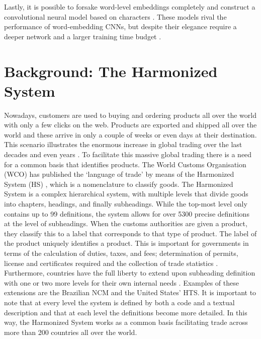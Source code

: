 Lastly, it is possible to forsake word-level embeddings completely and construct a convolutional neural model based on characters \cite{Zhang2015, Conneau2017, Shrestha}. These models rival the performance of word-embedding CNNs, but despite their elegance require a deeper network and a larger training time budget \cite{Le2017, Conneau2017, Adams2018}.

\newpage
\section{Background: The Harmonized System}
Nowadays, customers are used to buying and ordering products all over the world with only a few clicks on the web. Products are exported and shipped all over the world and these arrive in only a couple of weeks or even days at their destination. This scenario illustrates the enormous increase in global trading over the last decades \cite{EstebanOrtiz-Ospina2018} and even years \cite{World-Trade-Statistical-2018}. To facilitate this massive global trading there is a need for a common basis that identifies products. The World Customs Organisation (WCO) has published the ‘language of trade’ by means of the Harmonized System (HS) \cite{GeneralSecretariatoftheWorldCustomsOrganisationWCO1983, Chan2015} , which is a nomenclature to classify goods. The Harmonized System is a complex hierarchical system, with multiple levels that divide goods into chapters, headings, and finally subheadings. While the top-most level only contains up to 99 definitions, the system allows for over 5300 precise definitions at the level of subheadings. 
When the customs authorities are given a product, they classify this to a label that corresponds to that type of product. The label of the product uniquely identifies a product. This is important for governments in terms of the calculation of duties, taxes, and fees; determination of permits, license and certificates required and the collection of trade statistics \cite{Ding2015}. Furthermore, countries have the full liberty to extend upon subheading definition with one or two more levels for their own internal needs \cite{Weerth2008}. Examples of these extensions are the Brazilian NCM and the United States’ HTS. It is important to note that at every level the system is defined by both a code and a textual description and that at each level the definitions become more detailed. In this way, the Harmonized System works as a common basis facilitating trade across more than 200 countries all over the world.\\

